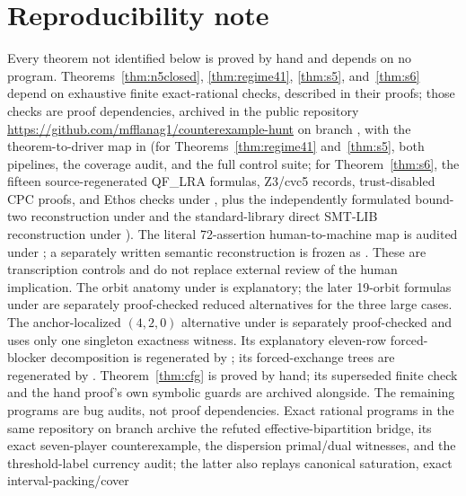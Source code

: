 \documentclass[11pt]{article}
\begin{document}
\section*{Reproducibility note}

Every theorem not identified below is proved by hand and depends on no
program.  Theorems~\ref{thm:n5closed}, \ref{thm:regime41}, \ref{thm:s5},
and~\ref{thm:s6} depend on exhaustive
finite exact-rational checks, described in their proofs; those checks are
proof dependencies, archived in the public repository
\url{https://github.com/mfflanag1/counterexample-hunt} on branch
, with the theorem-to-driver map in
 (for Theorems~\ref{thm:regime41}
and~\ref{thm:s5}, both pipelines, the coverage audit, and the full control
suite; for Theorem~\ref{thm:s6}, the fifteen source-regenerated QF\_LRA
formulas, Z3/cvc5 records, trust-disabled CPC proofs, and Ethos checks under
, plus the independently formulated
bound-two reconstruction under  and the
standard-library direct SMT-LIB reconstruction under
).
The literal 72-assertion human-to-machine map is audited under
; a separately written
semantic reconstruction is frozen as
.  These are
transcription controls and do not replace external review of the human
implication.  The orbit anatomy
under  is
explanatory; the later 19-orbit formulas under
 are separately proof-checked reduced
alternatives for the three large cases.  The anchor-localized $(4,2,0)$
alternative under  is separately
proof-checked and uses only one singleton exactness witness.  Its explanatory
eleven-row forced-blocker decomposition is regenerated by
; its forced-exchange
trees are regenerated by .
Theorem~\ref{thm:cfg} is proved by hand; its superseded finite
check and the hand proof's own symbolic guards are archived alongside.  The remaining
programs are bug audits, not proof dependencies.  Exact rational programs in the same repository
on branch  archive the refuted
effective-bipartition bridge, its exact seven-player counterexample, the
dispersion primal/dual witnesses, and the threshold-label currency audit;
the latter also replays canonical saturation, exact interval-packing/cover
\end{document}
